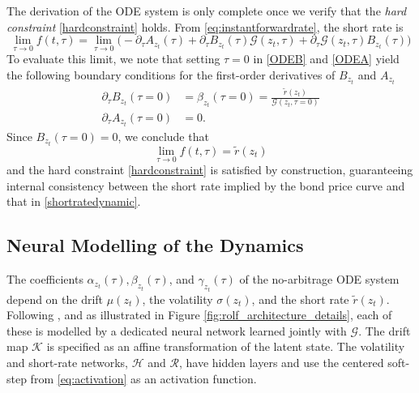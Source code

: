 The derivation of the ODE system is only complete once we verify that the \textit{hard constraint} \eqref{hardconstraint} holds. From \eqref{eq:instantforwardrate}, the short rate is
$$\lim_{\tau\rightarrow0}f(t,\tau)=\lim_{\tau\rightarrow0}\bigg(-\partial_{\tau}A_{z_t}(\tau)+\partial_{\tau}B_{z_t}(\tau)\mathcal{G}(z_t,\tau)+\partial_{\tau}\mathcal{G}(z_t,\tau)B_{z_t}(\tau)\bigg)$$
To evaluate this limit, we note that setting $\tau=0$ in \eqref{ODEB} and \eqref{ODEA} yield the following boundary conditions for the first-order derivatives of $B_{z_t}$ and $A_{z_t}$
\begin{align}
\partial_\tau B_{z_t}(\tau=0) &=\beta_{z_t}(\tau=0)=\frac{\tilde{r}(z_t)}{\mathcal{G}(z_t,\tau=0)}
\label{boundcondB}\\
\partial_\tau A_{z_t}(\tau=0) &= 0.
\label{boundcondA}
\end{align}
Since $B_{z_t}(\tau=0)=0$, we conclude that
$$\lim_{\tau\rightarrow0}f(t,\tau)=\tilde{r}(z_t)$$
and the hard constraint \eqref{hardconstraint} is satisfied by construction, guaranteeing internal consistency between the short rate implied by the bond price curve and that in \eqref{shortratedynamic}.


\subsection{Neural Modelling of the Dynamics}
\label{subsec:neural-modelling-dynamics}

The coefficients $\alpha_{z_t}(\tau),\beta_{z_t}(\tau)$, and $\gamma_{z_t}(\tau)$ of the no-arbitrage ODE system depend on the drift $\mu(z_t)$, the volatility $\sigma(z_t)$, and the short rate $\tilde{r}(z_t)$. Following \citet{MatinWanPoulsen2025}, and as illustrated in Figure \ref{fig:rolf_architecture_details}, each of these is modelled by a dedicated neural network learned jointly with $\mathcal{G}$. The drift map $\mathcal{K}$ is specified as an affine transformation of the latent state. The volatility and short-rate networks, $\mathcal{H}$ and $\mathcal{R}$, have hidden layers and use the centered soft-step from \eqref{eq:activation} as an activation function.


